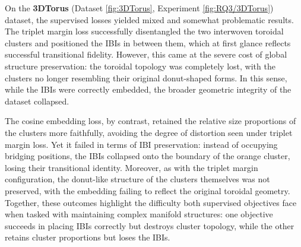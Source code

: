 On the \textbf{3DTorus} (Dataset \ref{fig:3DTorus}, Experiment \ref{fig:RQ3/3DTorus}) dataset, the supervised losses yielded mixed and somewhat problematic results. The triplet margin loss successfully disentangled the two interwoven toroidal clusters and positioned the IBIs in between them, which at first glance reflects successful transitional fidelity. However, this came at the severe cost of global structure preservation: the toroidal topology was completely lost, with the clusters no longer resembling their original donut-shaped forms. In this sense, while the IBIs were correctly embedded, the broader geometric integrity of the dataset collapsed.

The cosine embedding loss, by contrast, retained the relative size proportions of the clusters more faithfully, avoiding the degree of distortion seen under triplet margin loss. Yet it failed in terms of IBI preservation: instead of occupying bridging positions, the IBIs collapsed onto the boundary of the orange cluster, losing their transitional identity. Moreover, as with the triplet margin configuration, the donut-like structure of the clusters themselves was not preserved, with the embedding failing to reflect the original toroidal geometry. Together, these outcomes highlight the difficulty both supervised objectives face when tasked with maintaining complex manifold structures: one objective succeeds in placing IBIs correctly but destroys cluster topology, while the other retains cluster proportions but loses the IBIs.

